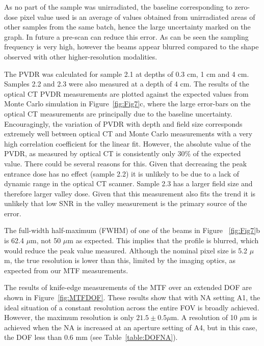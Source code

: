 	As no part of the sample was unirradiated, the baseline corresponding to zero-dose pixel value used is an average of values obtained from unirradiated areas of other samples from the same batch, hence the large uncertainty marked on the graph. In future a pre-scan can reduce this error. As can be seen the sampling frequency is very high, however the beams appear blurred compared to the shape observed with other higher-resolution modalities. 
	
	The PVDR was calculated for sample 2.1 at depths of 0.3 cm, 1 cm and 4 cm. Samples 2.2 and 2.3 were also measured at a depth of 4 cm. The results of the optical CT PVDR measurements are plotted against the expected values from Monte Carlo simulation \cite{martinez-roviradevelopment2012} in Figure~\ref{fig:Fig7}c, where the large error-bars on the optical CT measurements are principally due to the baseline uncertainty. Encouragingly, the variation of PVDR with depth and field size corresponds extremely well between optical CT and Monte Carlo measurements with a very high correlation coefficient for the linear fit. However, the absolute value of the PVDR, as measured by optical CT is consistently only 30\% of the expected value. There could be several reasons for this. Given that decreasing the peak entrance dose has no effect (sample 2.2) it is unlikely to be due to a lack of dynamic range in the optical CT scanner. Sample 2.3 has a larger field size and therefore larger valley dose. Given that this measurement also fits the trend it is unlikely that low SNR in the valley measurement is the primary source of the error. 
	
	The full-width half-maximum (FWHM) of one of the beams in Figure ~\ref{fig:Fig7}b is 62.4 $\mu$m, not 50 $\mu$m as expected. This implies that the profile is blurred, which would reduce the peak value measured. Although the nominal pixel size is 5.2 $\mu$m, the true resolution is lower than this, limited by the imaging optics, as expected from our MTF measurements. 
	
	The results of knife-edge measurements of the MTF over an extended DOF are shown in Figure~\ref{fig:MTFDOF}. These results show that with NA setting A1, the ideal situation of a constant resolution across the entire FOV is broadly achieved. However, the maximum resolution is only $21.5 \pm 0.5\mu$m. A resolution of 10 $\mu$m is achieved when the NA is increased at an aperture setting of A4, but in this case, the DOF less than 0.6 mm (see Table~\ref{table:DOFNA}).
	
